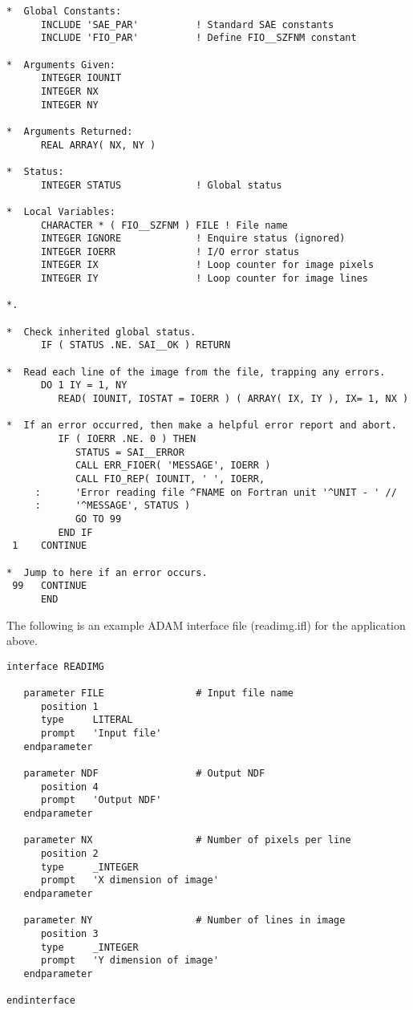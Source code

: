 \documentclass[twoside,11pt]{article}
\newcommand{\xref}[3]{#1}
\begin{document}
\begin{verbatim}
*  Global Constants:
      INCLUDE 'SAE_PAR'          ! Standard SAE constants
      INCLUDE 'FIO_PAR'          ! Define FIO__SZFNM constant

*  Arguments Given:
      INTEGER IOUNIT
      INTEGER NX
      INTEGER NY

*  Arguments Returned:
      REAL ARRAY( NX, NY )

*  Status:
      INTEGER STATUS             ! Global status

*  Local Variables:
      CHARACTER * ( FIO__SZFNM ) FILE ! File name
      INTEGER IGNORE             ! Enquire status (ignored)
      INTEGER IOERR              ! I/O error status
      INTEGER IX                 ! Loop counter for image pixels
      INTEGER IY                 ! Loop counter for image lines

*.

*  Check inherited global status.
      IF ( STATUS .NE. SAI__OK ) RETURN

*  Read each line of the image from the file, trapping any errors.
      DO 1 IY = 1, NY
         READ( IOUNIT, IOSTAT = IOERR ) ( ARRAY( IX, IY ), IX= 1, NX )

*  If an error occurred, then make a helpful error report and abort.
         IF ( IOERR .NE. 0 ) THEN
            STATUS = SAI__ERROR
            CALL ERR_FIOER( 'MESSAGE', IOERR )
            CALL FIO_REP( IOUNIT, ' ', IOERR,
     :      'Error reading file ^FNAME on Fortran unit '^UNIT - ' //
     :      '^MESSAGE', STATUS )
            GO TO 99
         END IF
 1    CONTINUE

*  Jump to here if an error occurs.
 99   CONTINUE     
      END
\end{verbatim}
\normalsize

The following is an example \xref{ADAM}{sg4}{} interface file
(readimg.ifl) for the application above. 

\small
\begin{verbatim}
interface READIMG

   parameter FILE                # Input file name
      position 1
      type     LITERAL
      prompt   'Input file'
   endparameter

   parameter NDF                 # Output NDF
      position 4
      prompt   'Output NDF'
   endparameter

   parameter NX                  # Number of pixels per line
      position 2
      type     _INTEGER
      prompt   'X dimension of image'
   endparameter

   parameter NY                  # Number of lines in image
      position 3
      type     _INTEGER
      prompt   'Y dimension of image'
   endparameter

endinterface
\end{verbatim}
\normalsize
\end{document}
